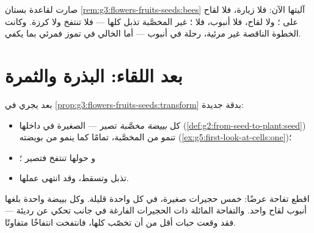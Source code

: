 \begin{example}\label{ex:g5:flower-to-fruit:unvisited}
صارت لقاعدة بستان \cref{rem:g3:flowers-fruits-seeds:bees} آليتها
الآن: فلا زيارة، فلا لقاح على ؛ ولا لقاح، فلا أنبوب، فلا
؛  غير المخصَّبة تذبل كلها --- فلا  تنتفخ ولا
كرزة. وكانت الخطوة الناقصة غير مرئية، رحلة  في أنبوب --- أما
 الخالي في تموز فمرئي بما يكفي.
\end{example}

\section{بعد اللقاء: البذرة والثمرة}

\begin{proposition}\label{prop:g5:flower-to-fruit:becomes}
بعد  يجري  في
\cref{prop:g3:flowers-fruits-seeds:transform} بدقة جديدة:
\begin{itemize}
  \item كل \emph{بييضة مخصَّبة} تصير \emph{} --- 
        الصغيرة في داخلها
        (\cref{def:g2:from-seed-to-plant:seed}) تنمو من 
        المخصَّبة، تمامًا كما ينمو  من بويضته
        (\cref{ex:g5:first-look-at-cells:one})؛
  \item و\emph{} حولها تنتفخ فتصير \emph{}؛
  \item {}  تذبل وتسقط، وقد انتهى عملها.
\end{itemize}
\end{proposition}
\admitted

\begin{example}[عدّ البذور]\label{ex:g5:flower-to-fruit:pips}
اقطع تفاحة عرضًا: خمس حجيرات صغيرة، في كل واحدة  قليلة. وكل
 بييضة واحدة بلغها أنبوب لقاح واحد. والتفاحة المائلة ذات
الحجيرات الفارغة في جانب تحكي عن  رديئة  --- فقد وقعت
حبات أقل من أن تخصّب  كلها، فانتفخت  انتفاخًا
متفاوتًا.
\end{example}

